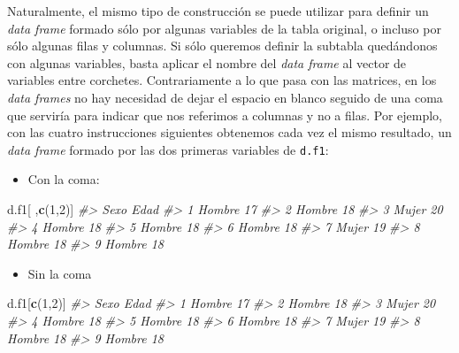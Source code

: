 \documentclass[
]{book}
\newenvironment{Shaded}{\begin{snugshade}}{\end{snugshade}}
\newcommand{\CommentTok}[1]{\textcolor[rgb]{0.56,0.35,0.01}{\textit{#1}}}
\newcommand{\DecValTok}[1]{\textcolor[rgb]{0.00,0.00,0.81}{#1}}
\newcommand{\KeywordTok}[1]{\textcolor[rgb]{0.13,0.29,0.53}{\textbf{#1}}}
\newcommand{\NormalTok}[1]{#1}
\providecommand{\tightlist}{%
  \setlength{\itemsep}{0pt}\setlength{\parskip}{0pt}}
\theoremstyle{definition}
\theoremstyle{definition}
\theoremstyle{definition}
\theoremstyle{remark}
\begin{document}
Naturalmente, el mismo tipo de construcción se puede utilizar para definir un \emph{data frame} formado sólo por algunas variables de la tabla original, o incluso por sólo algunas filas y columnas. Si sólo queremos definir la subtabla quedándonos con algunas variables, basta aplicar el nombre del \emph{data frame} al vector de variables entre corchetes. Contrariamente a lo que pasa con las matrices, en los \emph{data frames} no hay necesidad de dejar el espacio en blanco seguido de una coma que serviría para indicar que nos referimos a columnas y no a filas. Por ejemplo, con las cuatro instrucciones siguientes obtenemos cada vez el mismo resultado, un \emph{data frame} formado por las dos primeras variables de \texttt{d.f1}:

\begin{itemize}
\tightlist
\item
  Con la coma:
\end{itemize}

\begin{Shaded}
\begin{Highlighting}[]
\NormalTok{d.f1[ ,}\KeywordTok{c}\NormalTok{(}\DecValTok{1}\NormalTok{,}\DecValTok{2}\NormalTok{)]}
\CommentTok{\#\textgreater{}     Sexo Edad}
\CommentTok{\#\textgreater{} 1 Hombre   17}
\CommentTok{\#\textgreater{} 2 Hombre   18}
\CommentTok{\#\textgreater{} 3  Mujer   20}
\CommentTok{\#\textgreater{} 4 Hombre   18}
\CommentTok{\#\textgreater{} 5 Hombre   18}
\CommentTok{\#\textgreater{} 6 Hombre   18}
\CommentTok{\#\textgreater{} 7  Mujer   19}
\CommentTok{\#\textgreater{} 8 Hombre   18}
\CommentTok{\#\textgreater{} 9 Hombre   18}
\end{Highlighting}
\end{Shaded}

\begin{itemize}
\tightlist
\item
  Sin la coma
\end{itemize}

\begin{Shaded}
\begin{Highlighting}[]
\NormalTok{d.f1[}\KeywordTok{c}\NormalTok{(}\DecValTok{1}\NormalTok{,}\DecValTok{2}\NormalTok{)]}
\CommentTok{\#\textgreater{}     Sexo Edad}
\CommentTok{\#\textgreater{} 1 Hombre   17}
\CommentTok{\#\textgreater{} 2 Hombre   18}
\CommentTok{\#\textgreater{} 3  Mujer   20}
\CommentTok{\#\textgreater{} 4 Hombre   18}
\CommentTok{\#\textgreater{} 5 Hombre   18}
\CommentTok{\#\textgreater{} 6 Hombre   18}
\CommentTok{\#\textgreater{} 7  Mujer   19}
\CommentTok{\#\textgreater{} 8 Hombre   18}
\CommentTok{\#\textgreater{} 9 Hombre   18}
\end{Highlighting}
\end{Shaded}
\end{document}
